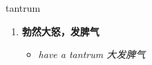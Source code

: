
\begin{frame}
{\huge tantrum}
\begin{center}
\begin{enumerate}\Large
  \item \textbf{勃然大怒，发脾气}
  \begin{itemize}
    \item \em{\Large{have a tantrum 大发脾气}}
  \end{itemize}
\end{enumerate}
\end{center}
\end{frame}
